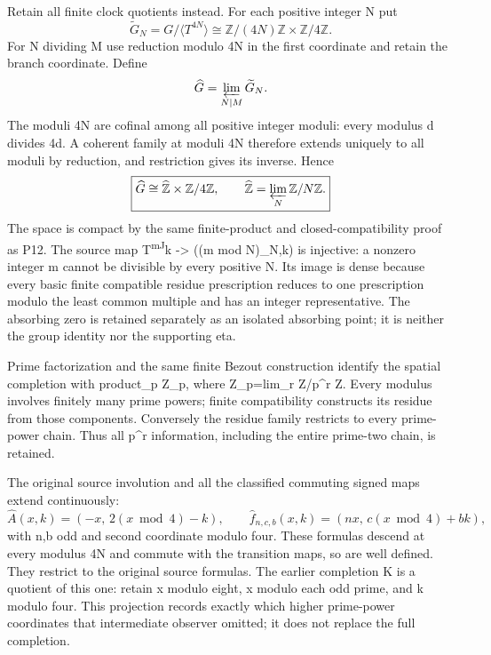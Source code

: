 \documentclass[
  11pt,
]{article}
\begin{document}
Retain all finite clock quotients instead. For each positive integer N
put \[
\widetilde G_N=G/\langle T^{4N}\rangle
\cong\mathbb Z/(4N)\mathbb Z\times\mathbb Z/4\mathbb Z.
\] For N dividing M use reduction modulo 4N in the first coordinate and
retain the branch coordinate. Define \[
\widehat G=\varprojlim_{N\mid M}\widetilde G_N.
\] The moduli 4N are cofinal among all positive integer moduli: every
modulus d divides 4d. A coherent family at moduli 4N therefore extends
uniquely to all moduli by reduction, and restriction gives its inverse.
Hence \[
\boxed{\widehat G\cong\widehat{\mathbb Z}\times\mathbb Z/4\mathbb Z,
\qquad\widehat{\mathbb Z}=\varprojlim_N\mathbb Z/N\mathbb Z.}
\] The space is compact by the same finite-product and
closed-compatibility proof as P12. The source map T\textsuperscript{mJ}k
-\textgreater{} ((m mod N)\_N,k) is injective: a nonzero integer m
cannot be divisible by every positive N. Its image is dense because
every basic finite compatible residue prescription reduces to one
prescription modulo the least common multiple and has an integer
representative. The absorbing zero is retained separately as an isolated
absorbing point; it is neither the group identity nor the supporting
eta.

Prime factorization and the same finite Bezout construction identify the
spatial completion with product\_p Z\_p, where Z\_p=lim\_r Z/p\^{}r Z.
Every modulus involves finitely many prime powers; finite compatibility
constructs its residue from those components. Conversely the residue
family restricts to every prime-power chain. Thus all p\^{}r
information, including the entire prime-two chain, is retained.

The original source involution and all the classified commuting signed
maps extend continuously: \[
\widehat A(x,k)=(-x,\,2(x\bmod4)-k),
\qquad
\widehat f_{n,c,b}(x,k)=(nx,\,c(x\bmod4)+bk),
\] with n,b odd and second coordinate modulo four. These formulas
descend at every modulus 4N and commute with the transition maps, so are
well defined. They restrict to the original source formulas. The earlier
completion K is a quotient of this one: retain x modulo eight, x modulo
each odd prime, and k modulo four. This projection records exactly which
higher prime-power coordinates that intermediate observer omitted; it
does not replace the full completion.
\end{document}
